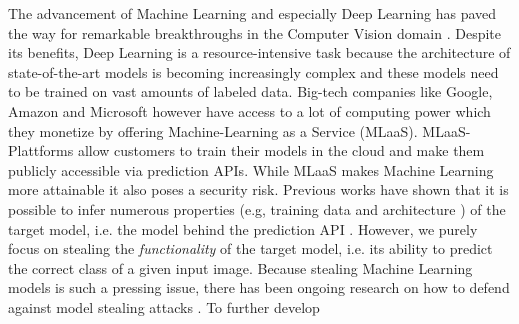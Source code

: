 
\Abstract
The advancement of Machine Learning and especially Deep Learning has paved the way for remarkable breakthroughs in the Computer Vision domain \cite{He_2016_CVPR} \cite{goodfellow2014generative} \cite{6795724}.
Despite its benefits, Deep Learning is a resource-intensive task because the architecture of state-of-the-art models is becoming increasingly complex and these models need to be trained on vast amounts of labeled data.
Big-tech companies like Google, Amazon and Microsoft however have access to a lot of computing power which they monetize by offering Machine-Learning as a Service (MLaaS). MLaaS-Plattforms allow customers
to train their models in the cloud and make them publicly accessible via prediction APIs. While MLaaS makes Machine Learning more attainable it also poses a security risk. Previous works have shown that it is possible
 to infer numerous properties (e.g, training data \cite{shokri2017membership} and architecture \cite{oh2019towards}) of the target model, i.e. the model behind the prediction API \cite{tramer2016stealing} \cite{papernot2017practical}.
 However, we purely focus on stealing the \textit{functionality} of the target model, i.e. its ability to predict the correct class of a given input image. Because stealing Machine Learning models is such a pressing issue, there has been
 ongoing research on how to defend against model stealing attacks \cite{orekondy2019prediction} \cite{juuti2019prada}. To further develop 